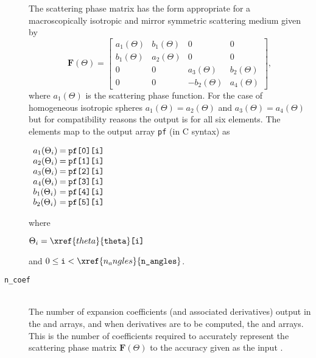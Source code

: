 \begin{description}
The scattering phase matrix has the form appropriate for a macroscopically isotropic and mirror symmetric scattering medium given by
\begin{equation}
\mathbf{F}(\Theta) =
\left[
\begin{array}{cccc}
a_{1}(\Theta) & b_{1}(\Theta) & 0 & 0 \\
b_{1}(\Theta) & a_{2}(\Theta) & 0 & 0 \\
0 & 0 & a_{3}(\Theta) & b_{2}(\Theta) \\
0 & 0 & -b_{2}(\Theta) & a_{4}(\Theta)
\end{array}
\right],
\label{eq:lmie_outputs_pf_f}
\end{equation}
where $a_{1}(\Theta)$ is the scattering phase function.  For the case of homogeneous isotropic spheres $a_{1}(\Theta) = a_{2}(\Theta)$ and $a_{3}(\Theta) = a_{4}(\Theta)$ but for compatibility reasons the output is for all six elements.  The elements map to the output array \texttt{pf} (in C syntax) as 
\begin{indentall}
\(
\begin{array}{l@{\hspace{.25em}}c@{\hspace{.25em}}l}
a_{1}(\Theta_{i}) &=& \texttt{pf[0][i]} \\
a_{2}(\Theta_{i}) &=& \texttt{pf[1][i]} \\
a_{3}(\Theta_{i}) &=& \texttt{pf[2][i]} \\
a_{4}(\Theta_{i}) &=& \texttt{pf[3][i]} \\
b_{1}(\Theta_{i}) &=& \texttt{pf[4][i]} \\
b_{2}(\Theta_{i}) &=& \texttt{pf[5][i]}
\end{array}
\)
\end{indentall}
where
\begin{indentall}
\(
\Theta_{i} = \xref{theta}{\texttt{theta}}\texttt{[i]}
\)
\end{indentall}
and $0 \le \texttt{i} < \xref{n_angles}{\texttt{n\_angles}}$.

\item[\texttt{n\_coef}] \hfill \\
The number of expansion coefficients (and associated derivatives) output in the  and  arrays, and when derivatives are to be computed, the  and  arrays.  This is the number of coefficients required to accurately represent the scattering phase matrix $\mathbf{F}(\Theta)$ to the accuracy given as the input .


\end{description}
